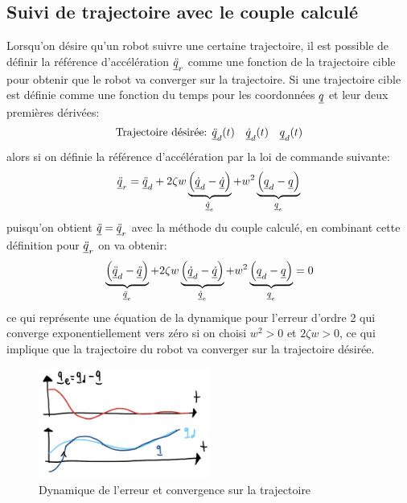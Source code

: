 \subsection{Suivi de trajectoire avec le couple calculé}

Lorsqu'on désire qu'un robot suivre une certaine trajectoire, il est possible de définir la référence d'accélération $\underline{\ddot{q}}_r$ comme une fonction de la trajectoire cible pour obtenir que le robot va converger sur la trajectoire. Si une trajectoire cible est définie comme une fonction du temps pour les coordonnées $\underline{q}$ et leur deux premières dérivées:
\begin{align}
\text{Trajectoire désirée: } \underline{\ddot{q}}_d(t) \quad \underline{\dot{q}}_d(t) \quad \underline{q}_d(t)
\end{align}
alors si on définie la référence d'accélération par la loi de commande suivante:
\begin{align}
\underline{\ddot{q}}_r = \underline{\ddot{q}}_d + 2 \zeta w 
\underbrace{\left( \underline{\dot{q}}_d - \underline{\dot{q}}\right)}_{ \underline{\dot{q}}_e}
+ w^2
\underbrace{\left( \underline{q}_d - \underline{q}\right)}_{ \underline{q}_e}
\end{align}
puisqu'on obtient $\underline{\ddot{q}} = \underline{\ddot{q}}_r$ avec la méthode du couple calculé, en combinant cette définition pour $\underline{\ddot{q}}_r$ on va obtenir:
\begin{align}
\underbrace{\left( \underline{\ddot{q}}_d - \underline{\ddot{q}} \right)}_{ \underline{\ddot{q}}_e}
 + 2 \zeta w 
\underbrace{\left( \underline{\dot{q}}_d - \underline{\dot{q}}\right)}_{ \underline{\dot{q}}_e}
+ w^2
\underbrace{\left( \underline{q}_d - \underline{q}\right)}_{ \underline{q}_e} = 0
\label{eq:computedtorqueerrordynamic}
\end{align}
ce qui représente une équation de la dynamique pour l'erreur d'ordre 2 qui converge exponentiellement vers zéro si on choisi $w^2>0$ et $2 \zeta w > 0$, ce qui implique que la trajectoire du robot va converger sur la trajectoire désirée. 
\begin{figure}[ht]
	\centering
		\includegraphics[width=0.50\textwidth]{fig/errordynamic.jpg}
	\caption{Dynamique de l'erreur et convergence sur la trajectoire}
	\label{fig:errordynamic}
\end{figure}


